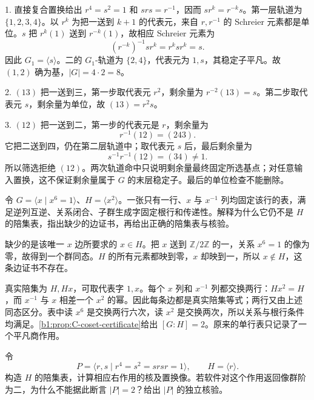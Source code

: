\begin{solution}
	1. 直接复合置换给出 \(r^4=s^2=1\) 和 \(srs=r^{-1}\)，因而 \(sr^k=r^{-k}s\)。第一层轨道为 \(\{1,2,3,4\}\)。以 \(r^k\) 为把一送到 \(k+1\) 的代表元，来自 \(r,r^{-1}\) 的 Schreier 元素都是单位。\(s\) 把 \(r^k(1)\) 送到 \(r^{-k}(1)\)，故相应 Schreier 元素为
	\[
		(r^{-k})^{-1}sr^k=r^ksr^k=s.
	\]
	因此 \(G_1=\langle s\rangle\)。二的 \(G_1\)-轨道为 \(\{2,4\}\)，代表元为 \(1,s\)，其稳定子平凡。故 \((1,2)\) 确为基，\(|G|=4\cdot2=8\)。

	2. \((13)\) 把一送到三，第一步取代表元 \(r^2\)，剩余量为 \(r^{-2}(13)=s\)。第二步取代表元 \(s\)，剩余量为单位，故 \((13)=r^2s\)。

	3. \((12)\) 把一送到二，第一步的代表元是 \(r\)，剩余量为
	\[
		r^{-1}(12)=(243).
	\]
	它把二送到四，仍在第二层轨道中；取代表元 \(s\) 后，最后剩余量为
	\[
		s^{-1}r^{-1}(12)=(34)\ne1.
	\]
	所以筛选拒绝 \((12)\)。两次轨道命中只说明剩余量最终固定所选基点；对任意输入置换，这不保证剩余量属于 \(G\) 的末层稳定子。最后的单位检查不能删除。
\end{solution}

\begin{exercise}\label{b1:ex:C-coset-table-false-positive}
	令 \(G=\langle x\mid x^6=1\rangle\)、\(H=\langle x^2\rangle\)。一张只有一行、\(x\) 与 \(x^{-1}\) 列均固定该行的表，满足逆列互逆、关系闭合、子群生成字固定根行和传递性。解释为什么它仍不是 \(H\) 的陪集表，指出缺少的边证书，再给出正确的陪集表与核验。
\end{exercise}

\begin{solution}
	缺少的是该唯一 \(x\) 边所要求的 \(x\in H\)。把 \(x\) 送到 \(\mathbb Z/2\mathbb Z\) 的一，关系 \(x^6=1\) 的像为零，故得到一个群同态。\(H\) 的所有元素都映到零，\(x\) 却映到一，所以 \(x\notin H\)，这条边证书不存在。

	真实陪集为 \(H,Hx\)，可取代表字 \(1,x\)。每个 \(x\) 列和 \(x^{-1}\) 列都交换两行：\(Hx^2=H\)，而 \(x^{-1}\) 与 \(x\) 相差一个 \(x^2\) 的幂。因此每条边都是真实陪集等式；两行又由上述同态区分。表中读 \(x^6\) 是交换两行六次，读 \(x^2\) 是交换两次，所以关系与根行条件均满足。\cref{b1:prop:C-coset-certificate}给出 \([G:H]=2\)。原来的单行表只记录了一个平凡商作用。
\end{solution}

\begin{exercise}\label{b1:ex:C-nonfaithful-coset-output}
	令
	\[
		P=\langle r,s\mid r^4=s^2=srsr=1\rangle,\qquad H=\langle r\rangle.
	\]
	构造 \(H\) 的陪集表，计算相应右作用的核及置换像。若软件对这个作用返回像群阶为二，为什么不能据此断言 \(|P|=2\)？给出 \(|P|\) 的独立核验。
\end{exercise}

